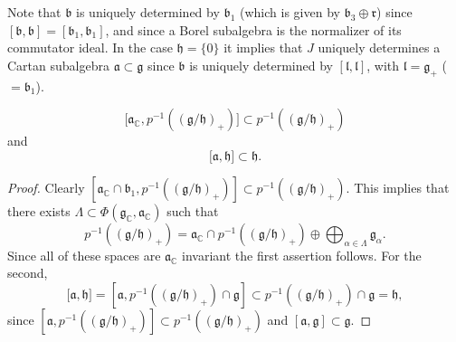 \documentclass{amse-new}
\numberwithin{equation}{section} %
\begin{document}
Note that $\mathfrak{b}$ is uniquely determined by $\mathfrak{b}_1$ (which  is given by $\mathfrak{b}_3\oplus \mathfrak{r}$) since $[\mathfrak{b}, \mathfrak{b}]=[\mathfrak{b}_1, \mathfrak{b}_1]$,  and  since a Borel subalgebra is the normalizer of its commutator ideal.  In the case $\mathfrak{h}=\{0\}$ it implies that $J$ uniquely determines a Cartan subalgebra $\mathfrak{a}\subset \mathfrak{g}$ since $\mathfrak{b}$ is uniquely determined by $[\mathfrak{l}, \mathfrak{l}]$, with $\mathfrak{l}=\mathfrak{g}_+$ ($=\mathfrak{b}_1$).

\begin{lemma}
\label{lmm:14}
\[
\lbrack\mathfrak{a}_{\mathbb{C}},p^{-1} ((\mathfrak{g}/\mathfrak{h})_+)]\subset
p^{-1} ((\mathfrak{g}/\mathfrak{h})_+)%
\]
and
\[
\lbrack\mathfrak{a,\mathfrak{h}}]\subset\mathfrak{h.}%
\]
\end{lemma}

\begin{proof}
Clearly $[\mathfrak{a}_{\mathbb{C}}\cap\mathfrak{b}_{1},p^{-1}((\mathfrak{g}/\mathfrak{h})_{+})]\subset p^{-1} ((\mathfrak{g}/\mathfrak{h})_+).$ This
implies that there exists $\Lambda\subset\Phi(\mathfrak{g}_{\mathbb{C}%
},\mathfrak{a}_{\mathbb{C}})$ such that%
\[
p^{-1} ((\mathfrak{g}/\mathfrak{h})_+)=\mathfrak{a}_{\mathbb{C}}\cap
p^{-1} ((\mathfrak{g}/\mathfrak{h})_+)\oplus\bigoplus_{\alpha\in\Lambda
}\mathfrak{g}_{\alpha}.
\]
Since all of these spaces are $\mathfrak{a}_{\mathbb{C}}$ invariant the first
assertion follows. For the second,%
\[
\lbrack\mathfrak{a},\mathfrak{h}]=[\mathfrak{a},p^{-1}((\mathfrak{g}/\mathfrak{h})_{+})\cap\mathfrak{g}]\subset p^{-1}((\mathfrak{g}/\mathfrak{h})_{+})\cap\mathfrak{g}=\mathfrak{h},%
\]
since $[\mathfrak{a}, p^{-1} ((\mathfrak{g}/\mathfrak{h})_+)]\subset p^{-1} ((\mathfrak{g}/\mathfrak{h})_+)$ and $[\mathfrak{a}, \mathfrak{g}]\subset \mathfrak{g}$.
\end{proof}
\end{document}
